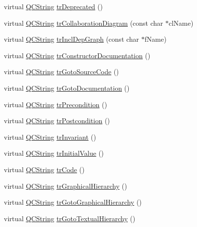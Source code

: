 \begin{DoxyCompactItemize}
virtual \hyperlink{class_q_c_string}{Q\+C\+String} \hyperlink{class_translator_greek_ae8c125f89492e3ececf7eba6d3d04e79}{tr\+Deprecated} ()
\item 
virtual \hyperlink{class_q_c_string}{Q\+C\+String} \hyperlink{class_translator_greek_a5f25400b841e578b8b335bd6f5626c17}{tr\+Collaboration\+Diagram} (const char $\ast$cl\+Name)
\item 
virtual \hyperlink{class_q_c_string}{Q\+C\+String} \hyperlink{class_translator_greek_a256778bb4bc81bd82287aefc81e1fd2c}{tr\+Incl\+Dep\+Graph} (const char $\ast$f\+Name)
\item 
virtual \hyperlink{class_q_c_string}{Q\+C\+String} \hyperlink{class_translator_greek_a407ce909b6f54b042b82697a21e1cac7}{tr\+Constructor\+Documentation} ()
\item 
virtual \hyperlink{class_q_c_string}{Q\+C\+String} \hyperlink{class_translator_greek_aea1f7a75598561ebdcc8b400451548e0}{tr\+Goto\+Source\+Code} ()
\item 
virtual \hyperlink{class_q_c_string}{Q\+C\+String} \hyperlink{class_translator_greek_ada7b8649bb7ee14feafe5ed80064e83a}{tr\+Goto\+Documentation} ()
\item 
virtual \hyperlink{class_q_c_string}{Q\+C\+String} \hyperlink{class_translator_greek_a6b8f76e8323537ee0d27e15514278c83}{tr\+Precondition} ()
\item 
virtual \hyperlink{class_q_c_string}{Q\+C\+String} \hyperlink{class_translator_greek_aba12a6d6c1105097806b579fe057150a}{tr\+Postcondition} ()
\item 
virtual \hyperlink{class_q_c_string}{Q\+C\+String} \hyperlink{class_translator_greek_afc20af712ce07a81c1ec4fbcb5660b50}{tr\+Invariant} ()
\item 
virtual \hyperlink{class_q_c_string}{Q\+C\+String} \hyperlink{class_translator_greek_a7fbf0b897f0cd94f5e492b7f2b1505df}{tr\+Initial\+Value} ()
\item 
virtual \hyperlink{class_q_c_string}{Q\+C\+String} \hyperlink{class_translator_greek_a9c126d8fef6827918e098bbbf06aaf1d}{tr\+Code} ()
\item 
virtual \hyperlink{class_q_c_string}{Q\+C\+String} \hyperlink{class_translator_greek_a97145c4afcb4a2f285fc8f9ca4417b85}{tr\+Graphical\+Hierarchy} ()
\item 
virtual \hyperlink{class_q_c_string}{Q\+C\+String} \hyperlink{class_translator_greek_a0039b1fa1d0facc1548b63de5df2b3cb}{tr\+Goto\+Graphical\+Hierarchy} ()
\item 
virtual \hyperlink{class_q_c_string}{Q\+C\+String} \hyperlink{class_translator_greek_a1d83f1794bb5c21b7b160401a32551a6}{tr\+Goto\+Textual\+Hierarchy} ()

\end{DoxyCompactItemize}
